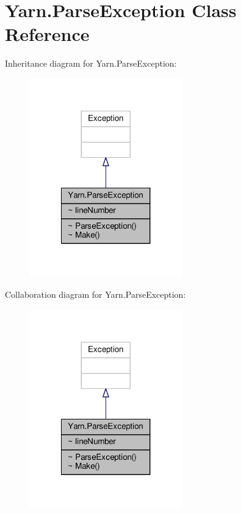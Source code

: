 \hypertarget{a00137}{\section{Yarn.\-Parse\-Exception Class Reference}
\label{a00137}
}


Inheritance diagram for Yarn.\-Parse\-Exception\-:
\nopagebreak
\begin{figure}[H]
\begin{center}
\leavevmode
\includegraphics[width=188pt]{a00625}
\end{center}
\end{figure}


Collaboration diagram for Yarn.\-Parse\-Exception\-:
\nopagebreak
\begin{figure}[H]
\begin{center}
\leavevmode
\includegraphics[width=188pt]{a00626}
\end{center}
\end{figure}
